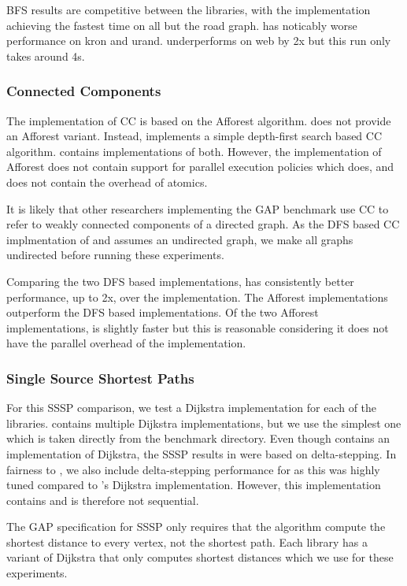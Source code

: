 BFS results are competitive between the libraries, with the \stdgraph implementation achieving the fastest time on all but the road graph.
\nwgraph has noticably worse performance on kron and urand.
\bgl underperforms on web by 2x but this run only takes around 4s.

\subsubsection{Connected Components}
The \nwgraph implementation of CC is based on the Afforest \cite{sutton2018optimizing} algorithm.
\bgl does not provide an Afforest variant.
Instead, \bgl implements a simple depth-first search based CC algorithm.
\stdgraph contains implementations of both.
However, the \stdgraph implementation of Afforest does not contain support for parallel execution
policies which \nwgraph does, and does not contain the overhead of atomics.

It is likely that other researchers implementing the GAP benchmark use CC to refer
to weakly connected components of a directed graph.
As the DFS based CC implmentation of \bgl and \stdgraph assumes an undirected graph,
we make all graphs undirected before running these experiments.

Comparing the two DFS based implementations, \stdgraph has consistently better performance, up to 2x, over the \bgl implementation.
The Afforest implementations outperform the DFS based implementations.
Of the two Afforest implementations, \stdgraph is slightly faster but this is reasonable considering
it does not have the parallel overhead of the \nwgraph implementation.

\subsubsection{Single Source Shortest Paths}
For this SSSP comparison, we test a Dijkstra implementation for each of the libraries.
\nwgraph contains multiple Dijkstra implementations, but we use the simplest one which
is taken directly from the \nwgraph benchmark directory.
Even though \nwgraph contains an implementation of Dijkstra,
the SSSP results in \cite{REF_nwgraph_paper} were based on delta-stepping.
In fairness to \nwgraph, we also include delta-stepping performance for \nwgraph 
as this was highly tuned compared to \nwgraph's Dijkstra implementation.
However, this implementation contains  and is therefore not sequential.

The GAP specification for SSSP only requires that the algorithm compute the shortest distance
to every vertex, not the shortest path.
Each library has a variant of Dijkstra that only computes shortest distances which we use for these experiments.

